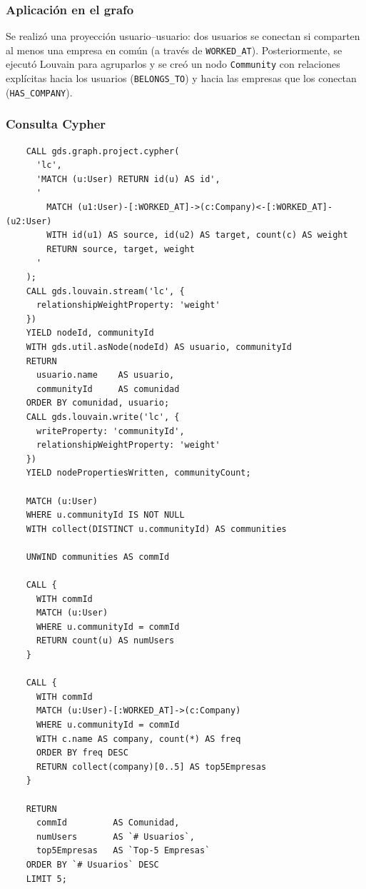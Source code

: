 \documentclass[10pt]{article}
\begin{document}
\subsubsection*{Aplicación en el grafo}
Se realizó una proyección usuario–usuario: dos usuarios se conectan si comparten al menos una empresa en común (a través de \texttt{WORKED\_AT}). Posteriormente, se ejecutó Louvain para agruparlos y se creó un nodo \texttt{Community} con relaciones explícitas hacia los usuarios (\texttt{BELONGS\_TO}) y hacia las empresas que los conectan (\texttt{HAS\_COMPANY}).

\subsubsection*{Consulta Cypher}
\begin{center}
	\begin{lstlisting}
    CALL gds.graph.project.cypher(
      'lc',
      'MATCH (u:User) RETURN id(u) AS id',
      '
        MATCH (u1:User)-[:WORKED_AT]->(c:Company)<-[:WORKED_AT]-(u2:User)
        WITH id(u1) AS source, id(u2) AS target, count(c) AS weight
        RETURN source, target, weight
      '
    );
    CALL gds.louvain.stream('lc', {
      relationshipWeightProperty: 'weight'
    })
    YIELD nodeId, communityId
    WITH gds.util.asNode(nodeId) AS usuario, communityId
    RETURN
      usuario.name    AS usuario,
      communityId     AS comunidad
    ORDER BY comunidad, usuario;
    CALL gds.louvain.write('lc', {
      writeProperty: 'communityId',
      relationshipWeightProperty: 'weight'
    })
    YIELD nodePropertiesWritten, communityCount;
    
    MATCH (u:User)
    WHERE u.communityId IS NOT NULL
    WITH collect(DISTINCT u.communityId) AS communities
    
    UNWIND communities AS commId
    
    CALL {
      WITH commId
      MATCH (u:User)
      WHERE u.communityId = commId
      RETURN count(u) AS numUsers
    }
    
    CALL {
      WITH commId
      MATCH (u:User)-[:WORKED_AT]->(c:Company)
      WHERE u.communityId = commId
      WITH c.name AS company, count(*) AS freq
      ORDER BY freq DESC
      RETURN collect(company)[0..5] AS top5Empresas
    }
    
    RETURN
      commId         AS Comunidad,
      numUsers       AS `# Usuarios`,
      top5Empresas   AS `Top-5 Empresas`
    ORDER BY `# Usuarios` DESC
    LIMIT 5;
    \end{lstlisting}
\end{center}
\end{document}
